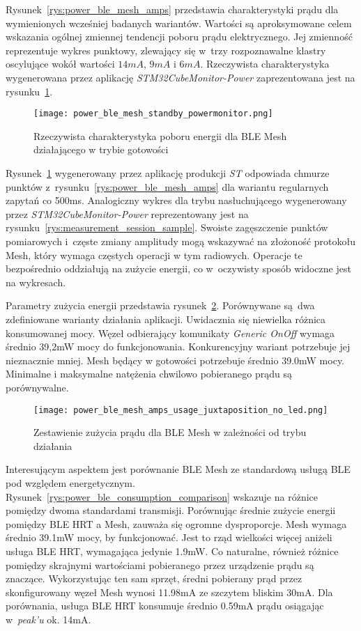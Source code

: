 Rysunek~\ref{rys:power_ble_mesh_amps} przedstawia charakterystyki prądu dla wymienionych wcześniej badanych wariantów. Wartości są aproksymowane
celem wskazania ogólnej zmiennej tendencji poboru prądu elektrycznego. Jej zmienność reprezentuje wykres punktowy, zlewający się 
w~trzy rozpoznawalne klastry oscylujące wokół wartości $14mA$, $9mA$ i $6mA$. Rzeczywista charakterystyka wygenerowana przez
aplikację \textit{STM32CubeMonitor-Power} zaprezentowana jest na rysunku~\ref{rys:power_ble_mesh_standby_powermonitor}.

\begin{figure}[!ht]
	\centering \texttt{[image: power\_ble\_mesh\_standby\_powermonitor.png]} 
	\caption{Rzeczywista charakterystyka poboru energii dla BLE Mesh działającego w trybie gotowości}
	\label{rys:power_ble_mesh_standby_powermonitor}
\end{figure}

Rysunek~\ref{rys:power_ble_mesh_standby_powermonitor} wygenerowany przez aplikację produkcji \textit{ST} odpowiada chmurze punktów
z~rysunku~\ref{rys:power_ble_mesh_amps} dla wariantu regularnych zapytań co 500ms. Analogiczny wykres dla
trybu nasłuchującego wygenerowany przez \textit{STM32CubeMonitor-Power} reprezentowany jest na rysunku~\ref{rys:measurement_session_sample}.
Swoiste zagęszczenie punktów pomiarowych i~częste zmiany amplitudy mogą wskazywać na złożoność protokołu Mesh,
który wymaga częstych operacji w tym radiowych. Operacje te bezpośrednio oddziałują na zużycie energii, co w~oczywisty
sposób widoczne jest na wykresach.

Parametry zużycia energii przedstawia rysunek~\ref{rys:power_ble_mesh_amps_usage_juxtaposition}. Porównywane są dwa zdefiniowane
warianty działania aplikacji. Uwidacznia się niewielka różnica konsumowanej mocy. Węzeł odbierający komunikaty \textit{Generic OnOff}
wymaga średnio 39,2mW mocy do funkcjonowania. Konkurencyjny wariant potrzebuje jej nieznacznie mniej. Mesh będący w gotowości
potrzebuje średnio 39.0mW mocy. Minimalne i maksymalne natężenia chwilowo pobieranego prądu są porównywalne.

\begin{figure}[!ht]
	\centering \texttt{[image: power\_ble\_mesh\_amps\_usage\_juxtaposition\_no\_led.png]} 
	\caption{Zestawienie zużycia prądu dla BLE Mesh w zależności od trybu działania}
	\label{rys:power_ble_mesh_amps_usage_juxtaposition}
\end{figure}

Interesującym aspektem jest porównanie BLE Mesh ze standardową usługą BLE pod względem energetycznym. Rysunek~\ref{rys:power_ble_consumption_comparison}
wskazuje na różnice pomiędzy dwoma standardami transmisji. Porównując średnie zużycie energii pomiędzy BLE HRT a Mesh, zauważa 
się ogromne dysproporcje. Mesh wymaga średnio 39.1mW mocy, by funkcjonować. Jest to rząd wielkości więcej aniżeli
usługa BLE HRT, wymagająca jedynie 1.9mW. Co naturalne, również różnice pomiędzy skrajnymi wartościami pobieranego
przez urządzenie prądu są znaczące. Wykorzystując ten sam sprzęt, średni pobierany prąd przez skonfigurowany węzeł Mesh
wynosi 11.98mA ze szczytem bliskim 30mA. Dla porównania, usługa BLE HRT konsumuje średnio 0.59mA prądu osiągając
w~\textit{peak'u} ok. 14mA.

